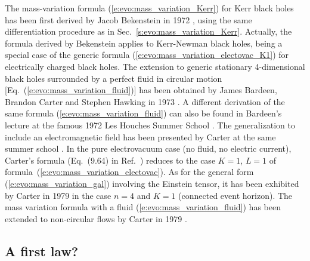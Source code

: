 \begin{hist}
The mass-variation formula (\ref{e:evo:mass_variation_Kerr}) for Kerr black holes
has been first
derived by Jacob Bekenstein
in 1972 \cite{Beken73a,Beken73b}, using the same differentiation procedure as in
Sec.~\ref{s:evo:mass_variation_Kerr}. Actually, the
formula derived by Bekenstein applies to
Kerr-Newman black holes, being a special
case of the generic formula (\ref{e:evo:mass_variation_electovac_K1})
for electrically charged black holes.
The extension to generic stationary 4-dimensional black holes
surrounded by a perfect fluid in circular motion [Eq.~(\ref{e:evo:mass_variation_fluid})]
has been obtained by James Bardeen, Brandon Carter
and Stephen Hawking in 1973 \cite{BardeCH73}.
A different derivation of the same formula (\ref{e:evo:mass_variation_fluid})
can also be found in Bardeen's lecture at the famous 1972 Les Houches Summer School
\cite{Barde73b}.
The generalization to include an electromagnetic field has been presented by Carter
at the same summer school \cite{Carte73b}. In the pure electrovacuum case
(no fluid, no electric current), Carter's formula (Eq.~(9.64) in Ref.~\cite{Carte73b})
reduces to the case $K=1$, $L=1$ of formula~(\ref{e:evo:mass_variation_electovac}).
As for the general form (\ref{e:evo:mass_variation_gal}) involving the Einstein tensor, it has been exhibited by Carter in 1979 \cite{Carte79c} in the case $n=4$ and $K=1$
(connected event horizon).
The mass variation formula with a fluid (\ref{e:evo:mass_variation_fluid}) has been extended to non-circular flows by Carter in 1979 \cite{Carte79b}.
\end{hist}


\subsection{A first law?}
\label{s:evo:a_first_law_question}

